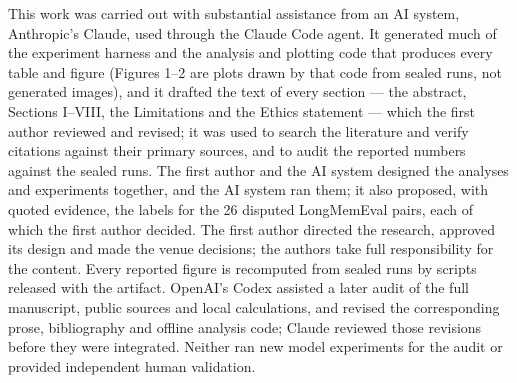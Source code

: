 \documentclass[conference]{IEEEtran}
\begin{document}
This work was carried out with substantial assistance from an AI system,
Anthropic's Claude, used through the Claude Code agent. It generated much of the
experiment harness and the analysis and plotting code that produces every table
and figure (Figures 1--2 are plots drawn by that code from sealed runs, not
generated images), and it drafted the text of every section --- the abstract,
Sections I--VIII, the Limitations and the Ethics statement --- which the first author
reviewed and revised; it was used to search the literature
and verify citations against their primary sources, and to audit the reported
numbers against the sealed runs. The first author and the AI system designed the
analyses and experiments together, and the AI system ran them; it also
proposed, with quoted evidence, the labels for the 26 disputed LongMemEval
pairs, each of which the first author decided. The first author directed the research, approved its
design and made the venue decisions; the authors take full responsibility for the content.
Every reported figure is recomputed from sealed runs by scripts released with
the artifact. OpenAI's Codex assisted a later audit of the full manuscript,
public sources and local calculations, and revised the corresponding prose,
bibliography and offline analysis code; Claude reviewed those revisions before
they were integrated. Neither ran new model experiments for the audit or
provided independent human validation.



\end{document}
